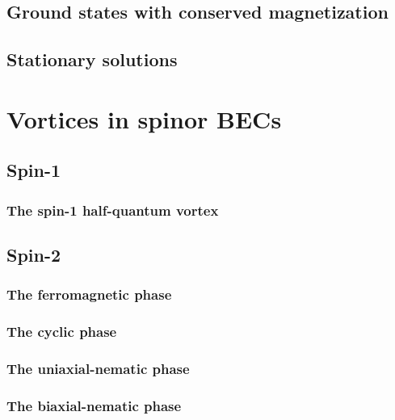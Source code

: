 \subsection{Ground states with conserved magnetization}

\subsection{Stationary solutions}

\section{Vortices in spinor BECs}

\subsection{Spin-1}
\subsubsection{The spin-1 half-quantum vortex}

\subsection{Spin-2}

\subsubsection{The ferromagnetic phase}
\subsubsection{The cyclic phase}
\subsubsection{The uniaxial-nematic phase}
\subsubsection{The biaxial-nematic phase}
